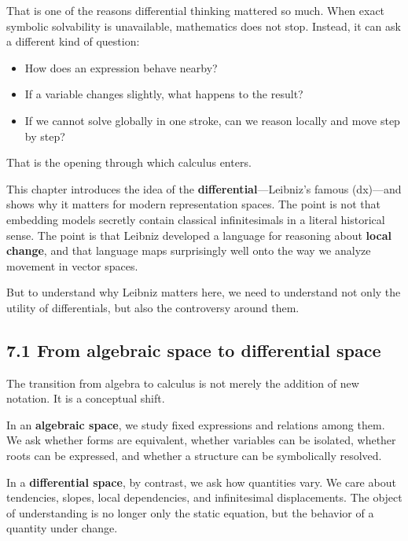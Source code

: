 \documentclass[
]{article}
\providecommand{\tightlist}{%
  \setlength{\itemsep}{0pt}\setlength{\parskip}{0pt}}
\begin{document}
That is one of the reasons differential thinking mattered so much. When
exact symbolic solvability is unavailable, mathematics does not stop.
Instead, it can ask a different kind of question:

\begin{itemize}
\tightlist
\item
  How does an expression behave nearby?
\item
  If a variable changes slightly, what happens to the result?
\item
  If we cannot solve globally in one stroke, can we reason locally and
  move step by step?
\end{itemize}

That is the opening through which calculus enters.

This chapter introduces the idea of the
\textbf{differential}---Leibniz's famous (dx)---and shows why it matters
for modern representation spaces. The point is not that embedding models
secretly contain classical infinitesimals in a literal historical sense.
The point is that Leibniz developed a language for reasoning about
\textbf{local change}, and that language maps surprisingly well onto the
way we analyze movement in vector spaces.

But to understand why Leibniz matters here, we need to understand not
only the utility of differentials, but also the controversy around them.

\hypertarget{from-algebraic-space-to-differential-space}{%
\subsection{7.1 From algebraic space to differential
space}\label{from-algebraic-space-to-differential-space}}

The transition from algebra to calculus is not merely the addition of
new notation. It is a conceptual shift.

In an \textbf{algebraic space}, we study fixed expressions and relations
among them. We ask whether forms are equivalent, whether variables can
be isolated, whether roots can be expressed, and whether a structure can
be symbolically resolved.

In a \textbf{differential space}, by contrast, we ask how quantities
vary. We care about tendencies, slopes, local dependencies, and
infinitesimal displacements. The object of understanding is no longer
only the static equation, but the behavior of a quantity under change.
\end{document}
